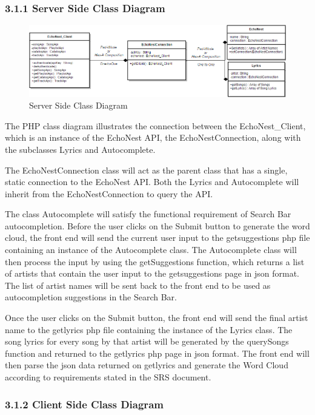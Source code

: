 \documentclass[]{article}
\begin{document}
\subsubsection{3.1.1 Server Side Class
Diagram}\label{server-side-class-diagram}

\begin{figure}[htbp]
\centering
\includegraphics{php_class_design_2.png}
\caption{Server Side Class Diagram}
\end{figure}

The PHP class diagram illustrates the connection between the
EchoNest\_Client, which is an instance of the EchoNest API, the
EchoNestConnection, along with the subclasses Lyrics and Autocomplete.

The EchoNestConnection class will act as the parent class that has a
single, static connection to the EchoNest API. Both the Lyrics and
Autocomplete will inherit from the EchoNestConnection to query the API.

The class Autocomplete will satisfy the functional requirement of Search
Bar autocompletion. Before the user clicks on the Submit button to
generate the word cloud, the front end will send the current user input
to the getsuggestions php file containing an instance of the
Autocomplete class. The Autocomplete class will then process the input
by using the getSuggestions function, which returns a list of artists
that contain the user input to the getsuggestions page in json format.
The list of artist names will be sent back to the front end to be used
as autocompletion suggestions in the Search Bar.

Once the user clicks on the Submit button, the front end will send the
final artist name to the getlyrics php file containing the instance of
the Lyrics class. The song lyrics for every song by that artist will be
generated by the querySongs function and returned to the getlyrics php
page in json format. The front end will then parse the json data
returned on getlyrics and generate the Word Cloud according to
requirements stated in the SRS document.

\subsubsection{3.1.2 Client Side Class
Diagram}\label{client-side-class-diagram}
\end{document}
